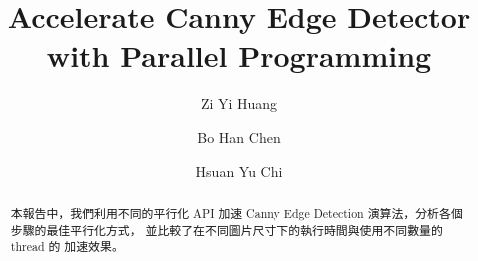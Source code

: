 \documentclass[sigconf,nonacm]{acmart}
\begin{document}
\title{Accelerate Canny Edge Detector with Parallel Programming}

\author{Zi Yi Huang}

\author{Bo Han Chen}

\author{Hsuan Yu Chi}


\begin{abstract}
  本報告中，我們利用不同的平行化 API 加速 Canny Edge Detection 演算法，分析各個步驟的最佳平行化方式，
  並比較了在不同圖片尺寸下的執行時間與使用不同數量的 thread 的 加速效果。
\end{abstract}

\end{document}

